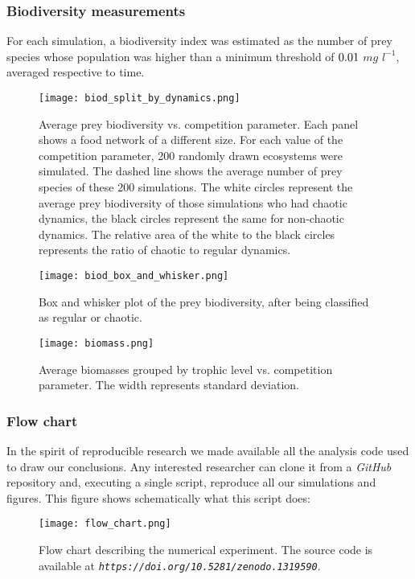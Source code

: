 \subsubsection{Biodiversity measurements}
\label{subsubsec:BiodiversityFigs}

For each simulation, a biodiversity index was estimated as the number of prey species whose population was higher than a minimum threshold of $0.01$ $mg$ $l^{-1}$, averaged respective to time.

\begin{figure}[H]
	\begin{center}
		\texttt{[image: biod\_split\_by\_dynamics.png]}
	\end{center}
	\caption{Average prey biodiversity vs. competition parameter. Each panel shows a food network of a different size. For each value of the competition parameter, 200 randomly drawn ecosystems were simulated. The dashed line shows the average number of prey species of these 200 simulations. The white circles represent the average prey biodiversity of those simulations who had chaotic dynamics, the black circles represent the same for non-chaotic dynamics. The relative area of the white to the black circles represents the ratio of chaotic to regular dynamics.}
	\label{fig:BiodSplitByChaos}
\end{figure}

\begin{figure}[H]
	\begin{center}
		\texttt{[image: biod\_box\_and\_whisker.png]}
	\end{center}
	\caption{Box and whisker plot of the prey biodiversity, after being classified as regular or chaotic.}
	\label{fig:BiodBoxAndWhisker}
\end{figure}

\begin{figure}[H]
	\begin{center}
		\texttt{[image: biomass.png]}
	\end{center}
	\caption{Average biomasses grouped by trophic level vs. competition parameter. The width represents standard deviation.}
	\label{fig:Biomass}
\end{figure}

\subsubsection{Flow chart}
\label{subsubsec:FlowChart}
In the spirit of reproducible research we made available all the analysis code used to draw our conclusions. Any interested researcher can clone it from a \textit{GitHub} repository \citep{Rodriguez-Sanchez-code-neuchaos} and, executing a single script, reproduce all our simulations and figures. This figure shows schematically what this script does:

\begin{figure}[H]
	\begin{center}
		\texttt{[image: flow\_chart.png]}
	\end{center}
	\caption{Flow chart describing the numerical experiment. The source code is available at \textit{\texttt{https://doi.org/10.5281/zenodo.1319590}}.}
	\label{fig:FlowChart}
\end{figure}
